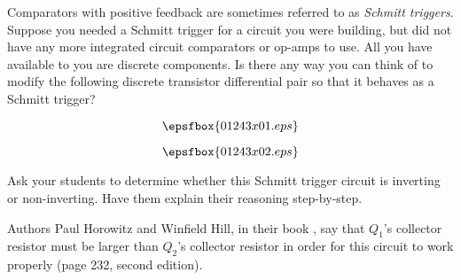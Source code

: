 

Comparators with positive feedback are sometimes referred to as {\it Schmitt triggers}.  Suppose you needed a Schmitt trigger for a circuit you were building, but did not have any more integrated circuit comparators or op-amps to use.  All you have available to you are discrete components.  Is there any way you can think of to modify the following discrete transistor differential pair so that it behaves as a Schmitt trigger?

$$\epsfbox{01243x01.eps}$$







$$\epsfbox{01243x02.eps}$$







Ask your students to determine whether this Schmitt trigger circuit is inverting or non-inverting.  Have them explain their reasoning step-by-step.

Authors Paul Horowitz and Winfield Hill, in their book , say that $Q_1$'s collector resistor must be larger than $Q_2$'s collector resistor in order for this circuit to work properly (page 232, second edition).




